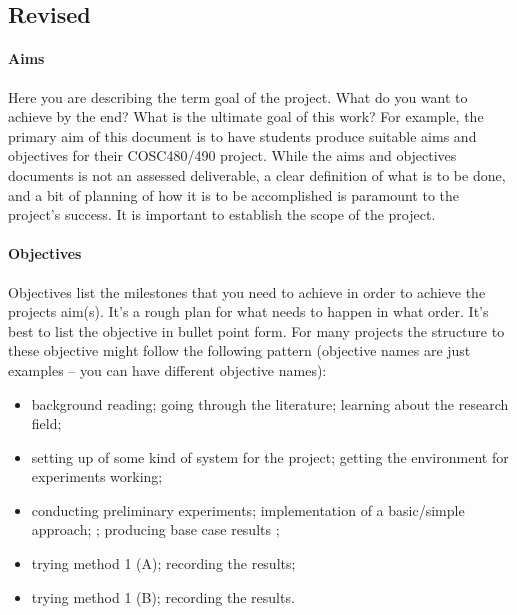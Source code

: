 \documentclass[12pt]{article}
\begin{document}
\subsection*{Revised}

\paragraph{Aims}
Here you are describing the term goal of the project.  What do you want to achieve by the end?  What is the ultimate goal of this work?  For example, the primary aim of this document is to have students produce suitable aims and objectives for their COSC480/490 project.  While the aims and objectives documents is not an assessed deliverable, a clear definition of what is to be done, and a bit of planning of how it is to be accomplished is paramount to the project's success.  It is important to establish the scope of the project.

\paragraph{Objectives}
Objectives list the milestones that you need to achieve in order to achieve the projects aim(s).  It's a rough plan for what needs to happen in what order.  It's best to list the objective in bullet point form.  For many projects the structure to these objective might follow the following pattern (objective names are just examples -- you can have different objective names):
\begin{itemize}[noitemsep]
	\item background reading; going through the literature; learning about the research field;
	\item setting up of some kind of system for the project; getting the environment for experiments working;
	\item conducting preliminary experiments; implementation of a basic/simple approach; ; producing base case results ;
	\item trying method 1 (A); recording the results;
	\item trying method 1 (B); recording the results.
\end{itemize}
\end{document}
